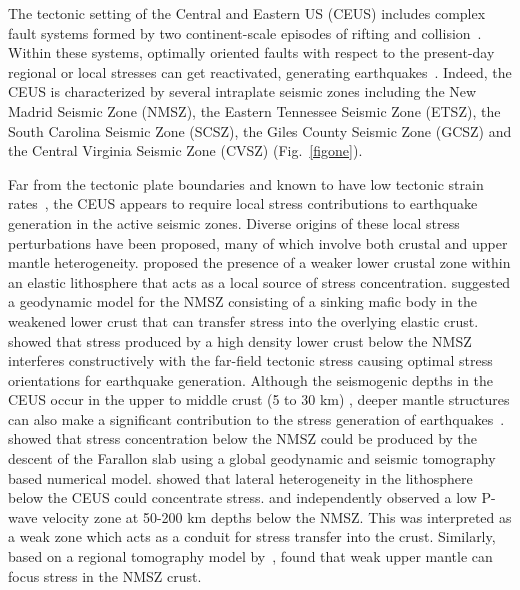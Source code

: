 \documentclass[draft,linenumbers]{agujournal2018}
\begin{document}
    The tectonic setting of the Central and Eastern US (CEUS) includes complex fault systems formed by two continent-scale episodes of rifting and collision~\citep[e.g.,][]{keller1983role, hoffman1989precambrian, thomas2006tectonic}. Within these systems, optimally oriented faults with respect to the present-day regional or local stresses can get reactivated, generating earthquakes~\citep[e.g.,][]{zoback1992stress, hurd2012intraplate}. Indeed, the CEUS is characterized by several intraplate seismic zones including the New Madrid Seismic Zone (NMSZ), the Eastern Tennessee Seismic Zone (ETSZ), the South Carolina Seismic Zone (SCSZ), the Giles County Seismic Zone (GCSZ) and the Central Virginia Seismic Zone (CVSZ) (Fig.~\ref{figone}). 
    
    Far from the tectonic plate boundaries and known to have low tectonic strain rates~\citep{Boyd_2015}, the CEUS appears to require local stress contributions to earthquake generation in the active seismic zones. Diverse origins of these local stress perturbations have been proposed, many of which involve both crustal and upper mantle heterogeneity. \citet{Kenner_2000a} proposed the presence of a weaker lower crustal zone within an elastic lithosphere that acts as a local source of stress concentration. \citet{Pollitz_2001} suggested a geodynamic model for the NMSZ consisting of a sinking mafic body in the weakened lower crust that can transfer stress into the overlying elastic crust. \citet{levandowski2016dense} showed that stress produced by a high density lower crust below the NMSZ interferes constructively with the far-field tectonic stress causing optimal stress orientations for earthquake generation.  Although the seismogenic depths in the CEUS occur in the upper to middle crust (5 to 30 km) \citep{vlahovic1998et1d, johnston1996seismic, mazzotti2010state}, deeper mantle structures can also make a significant contribution to the stress generation of  earthquakes~\citep[e.g.,][]{forte2007descent, li2007stress, chen2014crust, nyamwandha2016joint, zhan2016stress}. \citet{forte2007descent} showed that stress concentration below the NMSZ could be produced by the descent of the Farallon slab using a global geodynamic and seismic tomography based numerical model. \citet{li2007stress} showed that lateral heterogeneity in the lithosphere below the CEUS could concentrate stress. \citet{chen2014crust} and \citet{nyamwandha2016joint} independently observed a low P-wave velocity zone at 50-200 km depths below the NMSZ. This was interpreted as a weak zone which acts as a conduit for stress transfer into the crust. Similarly, based on a regional tomography model by~\citet{pollitz2014seismic}, \citet{zhan2016stress} found that weak upper mantle can focus stress in the NMSZ crust.
    
\end{document}
